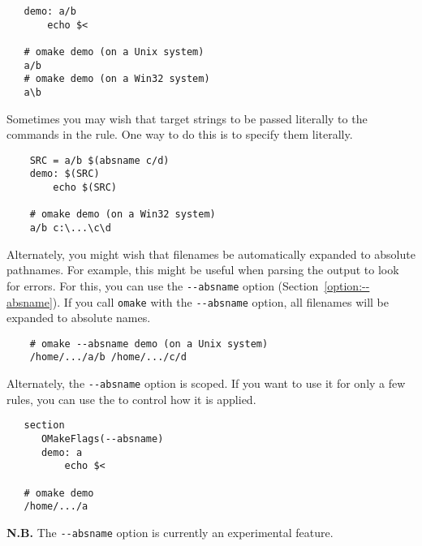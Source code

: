\begin{verbatim}
   demo: a/b
       echo $<

   # omake demo (on a Unix system)
   a/b
   # omake demo (on a Win32 system)
   a\b
\end{verbatim}

Sometimes you may wish that target strings to be passed literally to the commands in the rule.
One way to do this is to specify them literally.

\begin{verbatim}
    SRC = a/b $(absname c/d)
    demo: $(SRC)
        echo $(SRC)

    # omake demo (on a Win32 system)
    a/b c:\...\c\d
\end{verbatim}

Alternately, you might wish that filenames be automatically expanded to absolute pathnames.  For
example, this might be useful when parsing the \OMake{} output to look for errors.  For this, you can
use the \verb+--absname+ option (Section~\ref{option:--absname}).  If you call \verb+omake+ with the
\verb+--absname+ option, all filenames will be expanded to absolute names.

\begin{verbatim}
    # omake --absname demo (on a Unix system)
    /home/.../a/b /home/.../c/d
\end{verbatim}

Alternately, the \verb+--absname+ option is scoped.  If you want to use it for only a few rules, you
can use the  to control how it is applied.
    
\begin{verbatim}
   section
      OMakeFlags(--absname)
      demo: a
          echo $<

   # omake demo
   /home/.../a
\end{verbatim}

\textbf{N.B.} The \verb+--absname+ option is currently an experimental feature.

